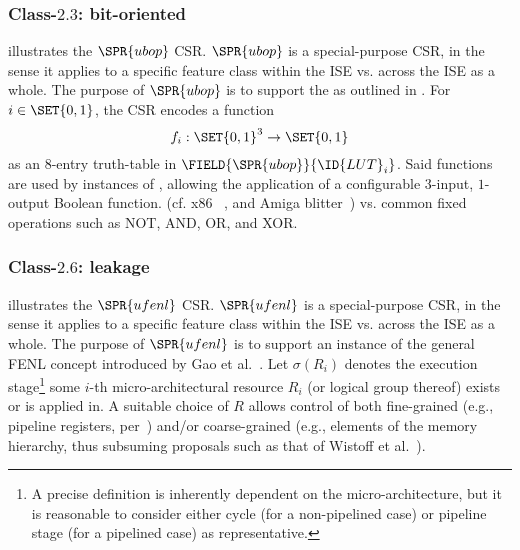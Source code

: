 
\subsubsection{Class-$2.3$: bit-oriented}
\label{sec:spec:state:2:3}

illustrates the 
$\SPR{ubop}$
CSR.
$\SPR{ubop}$
is a special-purpose CSR, in the sense it applies 
to a specific feature class within the ISE
vs.
across the ISE as a whole.
The purpose of 
$\SPR{ubop}$
is to support the
as outlined in 
.
For $i \in \SET{ 0, 1 }$, the CSR encodes a function
\[
f_i : \SET{ 0, 1 }^3 \rightarrow \SET{ 0, 1 }
\]
as an $8$-entry truth-table in $\FIELD{\SPR{ubop}}{\ID{LUT}_{i}}$.
Said functions are used by instances of , allowing the
application of a configurable $3$-input, $1$-output Boolean function.
(cf. x86 ~\cite[5-446--5-468]{SCARV:X86:2:18}, and Amiga blitter~\cite[Chapter 6]{SCARV:Amiga:85})
vs. common fixed operations such as NOT, AND, OR, and XOR.


\subsubsection{Class-$2.6$: leakage}
\label{sec:spec:state:2:6}

illustrates the 
$\SPR{ufenl}$
CSR.
$\SPR{ufenl}$
is a special-purpose CSR, in the sense it applies 
to a specific feature class within the ISE
vs.
across the ISE as a whole.
The purpose of 
$\SPR{ufenl}$
is to support an instance of the general FENL concept introduced by 
Gao et al.~\cite{SCARV:GMPP:20}.
Let
$
\sigma( R_i )
$
denotes the execution stage\footnote{%
A precise definition is inherently dependent on the micro-architecture, 
but it is reasonable to consider either
cycle          (for a non-pipelined case)
or
pipeline stage (for a     pipelined case)
as representative.
} some $i$-th micro-architectural resource $R_i$ (or logical group 
thereof) exists or is applied in.
A suitable choice of $R$ allows control of both 
  fine-grained 
(e.g., pipeline registers, per~\cite{SCARV:GMPP:20})
and/or
coarse-grained
(e.g., elements of the memory hierarchy, thus subsuming proposals such as that of Wistoff et al.~\cite[Section 2.4]{SCARV:WSGBH:20}).

